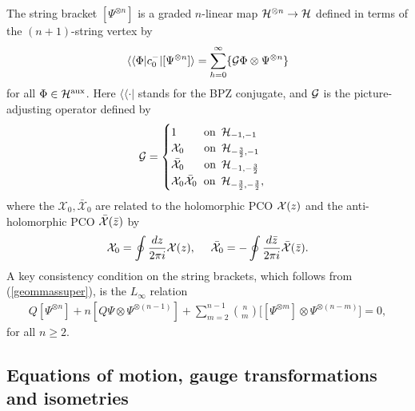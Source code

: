 \documentclass[12pt]{article}
\def\be{\begin{equation}}
\def\ee{\end{equation}}
\def\ie{\begin{equation}\begin{aligned}}
\def\fe{\end{aligned}\end{equation}}
\numberwithin{equation}{section}
\newcommand{\mc}[1]{\todo[color=lightgray!50, size=\scriptsize, bordercolor=lightgray]{MC: #1}}
\begin{document}
The string bracket $[\Psi^{\otimes n}]$ is a graded $n$-linear map ${\cal H}^{\otimes n}\to {\cal H}$ defined in terms of the $(n+1)$-string vertex by %
\ie\label{superstringbrack}
\langle\langle \Phi| c_0^- |[\Psi^{\otimes n}]\rangle = \sum_{h=0}^\infty \{ {\cal G} \Phi\otimes \Psi^{\otimes n} \}
\fe
for all $\Phi\in {\cal H}^{\rm aux}$. Here $\langle\langle\cdot|$ stands for the BPZ conjugate, and ${\cal G}$ is the picture-adjusting operator defined by
\be
\mathcal{G} =
\begin{cases}
    1 \, \, \, \, \, \, \hspace{0.5 cm} \text{on} \, \, \, \mathcal{H}_{-1, -1} \\
    \mathcal{X}_0  \, \, \, \hspace{0.45cm} \text{on} \, \, \, \mathcal{H}_{-\frac{3}{2}, -1} \\
    \bar{\mathcal{X}}_0 \, \, \, \hspace{0.45cm}\text{on} \, \, \, \mathcal{H}_{-1, -\frac{3}{2}} \\
    \mathcal{X}_0 \bar{\mathcal{X}}_0  \, \, \, \hspace{0.03cm}\text{on} \, \, \, \mathcal{H}_{-\frac{3}{2}, -\frac{3}{2}},
\end{cases}
\ee
where the $\mathcal{X}_0, \bar{\mathcal{X}}_0$ are related to the holomorphic PCO ${\cal X}(z)$ and the anti-holomorphic PCO $\bar{\cal X}(\bar z)$ by
\ie
{\cal X}_0 = \oint {dz\over 2\pi i} {\cal X}(z),~~~~ \bar {\cal X}_0 = -\oint {d\bar z\over 2\pi i} \bar {\cal X}(\bar z).
\fe
A key consistency condition on the string brackets, which follows from (\ref{geommassuper}), is the $L_\infty$ relation
\ie\label{linfty}
Q  [ \Psi^{\otimes n}  ] + n  [ Q \Psi \otimes \Psi^{\otimes (n-1)} ]
+ \sum_{m=2}^{n-1} {n\choose m}  \big[  [ \Psi^{\otimes m} ] \otimes \Psi^{\otimes (n-m)}  \big] = 0,
\fe
for all $n\geq 2$.

\subsection{Equations of motion, gauge transformations and isometries}
\label{gaugeTransforms}
\end{document}
